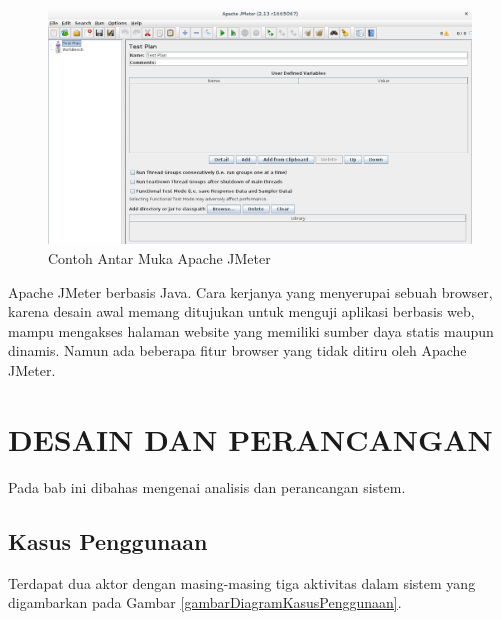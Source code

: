 \documentclass{ta-its}
\begin{document}
			\begin{figure}[h] %
				\centering
				\includegraphics[width=\linewidth]{contoh_img/contoh_jmeter}
				\caption{Contoh Antar Muka Apache JMeter}
				\label{contohJMeter}
			\end{figure}
			
			Apache JMeter berbasis Java. Cara kerjanya yang menyerupai sebuah browser, karena desain awal memang ditujukan untuk menguji aplikasi berbasis web, mampu mengakses halaman website yang memiliki sumber daya statis maupun dinamis. Namun ada beberapa fitur browser yang tidak ditiru oleh Apache JMeter.


    \chapter{DESAIN DAN PERANCANGAN}
	    Pada bab ini dibahas mengenai analisis dan perancangan sistem.
	    
	    \section{Kasus Penggunaan}
		    Terdapat dua aktor dengan masing-masing tiga aktivitas dalam sistem yang digambarkan pada Gambar \ref{gambarDiagramKasusPenggunaan}.
		    
\end{document}
